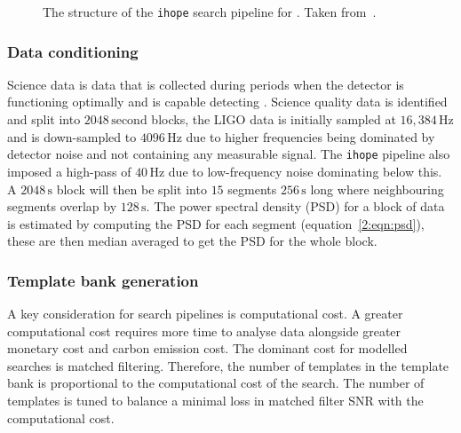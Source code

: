 \begin{figure}
    \caption{The structure of the \verb|ihope| search pipeline for \gws. Taken from~\cite{IHOPE:2012zx}.}
    \label{2:fig:ihope-flowchart}
\end{figure}

\subsubsection{Data conditioning}

Science data is \gwadj data that is collected during periods when the detector is functioning optimally and is capable detecting \gws. Science quality data is identified and split into $2048 \, \text{second}$ blocks, the LIGO data is initially sampled at $16,384 \, \text{Hz}$ and is down-sampled to $4096 \, \text{Hz}$ due to higher frequencies being dominated by detector noise and not containing any measurable \gwadj signal. The \verb|ihope| pipeline also imposed a high-pass of $40 \, \text{Hz}$ due to low-frequency noise dominating below this. A $2048 \, \text{s}$ block will then be split into $15$ segments $256 \, \text{s}$ long where neighbouring segments overlap by $128 \, \text{s}$. The power spectral density (PSD) for a block of data is estimated by computing the PSD for each segment (equation~\ref{2:eqn:psd}), these are then median averaged to get the PSD for the whole block.

\subsubsection{Template bank generation}

A key consideration for \gwadj search pipelines is computational cost. A greater computational cost requires more time to analyse \gwadj data alongside greater monetary cost and carbon emission cost. The dominant cost for modelled searches is matched filtering. Therefore, the number of templates in the template bank is proportional to the computational cost of the search. The number of templates is tuned to balance a minimal loss in matched filter SNR with the computational cost.

